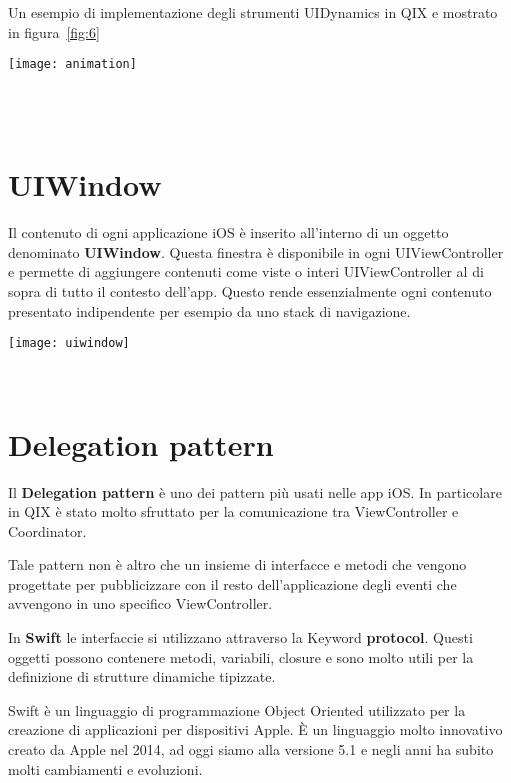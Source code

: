 Un esempio di implementazione degli strumenti UIDynamics in QIX e mostrato in figura~\ref{fig:6}

\begin{minipage}{\linewidth}
    \centering
    \texttt{[image: animation]}
    \label{fig:6}
\end{minipage}\\\\

\section{UIWindow}\label{sec:uiwindow}

Il contenuto di ogni applicazione iOS è inserito all'interno di un oggetto denominato
\textbf{UIWindow}\cite{uiwindow}. Questa finestra è disponibile in ogni UIViewController e permette di aggiungere contenuti
come viste o interi UIViewController al di sopra di tutto il contesto dell'app. Questo rende essenzialmente ogni contenuto presentato
indipendente per esempio da uno stack di navigazione.

\begin{minipage}{\linewidth}
    \centering
    \texttt{[image: uiwindow]}
    \label{fig:7}
\end{minipage}\\


\section{Delegation pattern}\label{delegation}

Il \textbf{Delegation pattern} è uno dei pattern più usati nelle app iOS. In particolare in QIX
è stato molto sfruttato per la comunicazione tra ViewController e Coordinator.

Tale pattern non è altro che un insieme di interfacce e metodi che
vengono progettate per pubblicizzare con il resto dell'applicazione degli eventi che avvengono in uno specifico ViewController.

In \textbf{Swift} le interfaccie si utilizzano attraverso la Keyword \textbf{protocol}. Questi oggetti possono contenere metodi, variabili, closure
e sono molto utili per la definizione di strutture dinamiche tipizzate.

Swift è un linguaggio di programmazione Object Oriented utilizzato per la creazione di applicazioni per dispositivi Apple. È un
linguaggio molto innovativo creato da Apple nel 2014, ad oggi siamo alla versione 5.1 e negli anni ha subito molti cambiamenti e evoluzioni.

